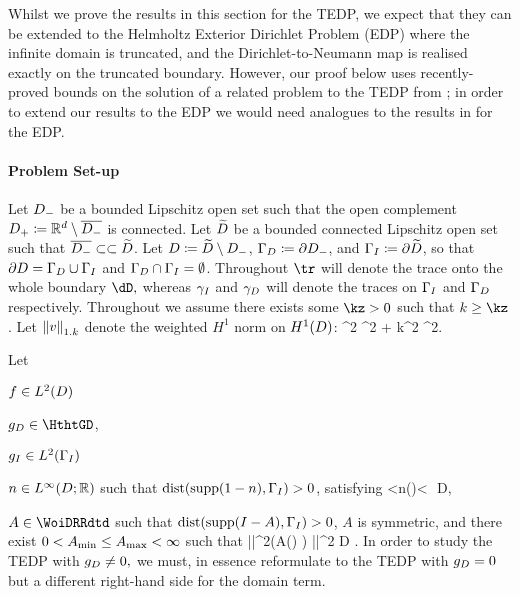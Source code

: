 Whilst we prove the results in this section for the TEDP, we expect that they can be extended to the Helmholtz Exterior Dirichlet Problem (EDP) where the infinite domain is truncated, and the Dirichlet-to-Neumann map is realised exactly on the truncated boundary. However, our proof below uses recently-proved bounds on the solution of a related problem to the TEDP from \cite{ChNiTo:18}; in order to extend our results to the EDP we would need analogues to the results in \cite{ChNiTo:18} for the EDP.

\paragraph{Problem Set-up} Let $D_{-}$ be a bounded Lipschitz open set such that the open complement $D_{+}\coloneqq \mathbb R^{d}\setminus \overline{D_{-}}$ is connected. Let $\widetilde{D}$ be a bounded connected Lipschitz open set such that $\overline{D_{-}} \subset\subset\widetilde{D}$. 
Let $D\coloneqq\widetilde{D}\setminus D_{-}$, $\Gamma_{D}\coloneqq \partial D_{-}$, and $\Gamma_{I} \coloneqq\partial \widetilde{D}$, so that $\partial D= \Gamma_{D} \cup \Gamma_{I}$ and $\Gamma_{D}\cap \Gamma_{I} = \emptyset$. Throughout $\tr$ will denote the trace onto the whole boundary $\dD,$ whereas $\gamma_{I}$ and $\gamma_{D}$ will denote the traces on $\Gamma_{I}$ and $\Gamma_{D}$ respectively. Throughout we assume there exists some $\kz > 0$ such that $k \geq \kz$. Let $\NW{v}$ denote the weighted $H^1$ norm on $\HoD$:
\beqs
{}^2 \de {}^2 + k^2 ^2.
\eeqs


Let
\bit
\item $f\in \LtD$ 
\item $\gD\in \HthtGD$,
\item $\gI\in \LtGI$
\item $n\in \LiDRR$ such that $\dist\mleft(\supp\mleft(1-n\mright),\GI\mright)>0$, satisfying
<\nmin \leq n\mleft(\bx\mright)\leq\nmax<\infty\,\,  \bx \in D,
\eeq
\item $A \in \WoiDRRdtd$ such that $\dist\mleft(\supp\mleft(I -A\mright),\GI\mright)>0$, $A$ is symmetric, and there exist $0<A_{\min}\leq A_{\max}<\infty$ such that
\beq\label{eq:AellEDP}
 \Amin |\bxi|^2\leq\mleft(A\mleft(\bx\mright) \bxi\mright) \cdot \overline{ \bxi}  \leq \Amax|\bxi|^2 \quad{}\bx \in D  \bxi\in \CCd.
\eeq
\eit
In order to study the TEDP with $g_{D}\neq0,$ we must, in essence reformulate to the TEDP with $g_{D}=0$ but a different right-hand side for the domain term.

